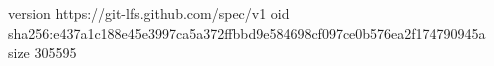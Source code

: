 version https://git-lfs.github.com/spec/v1
oid sha256:e437a1c188e45e3997ca5a372ffbbd9e584698cf097ce0b576ea2f174790945a
size 305595
